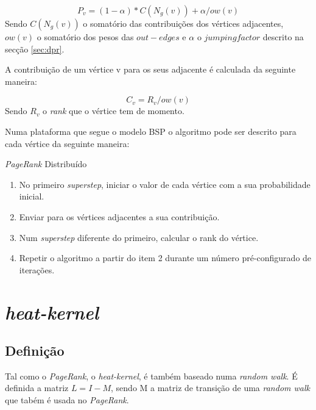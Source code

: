 \documentclass[a4paper,10pt]{report}
\begin{document}
  \begin{center}
    \begin{equation}
      \label{eq:prrankdistributed}
       P_v = (1-\alpha) * C(N_g(v)) + \alpha/ow(v)
    \end{equation}
    Sendo $C(N_g(v))$ o somatório das contribuições dos vértices adjacentes, $ow(v)$ o somatório dos pesos das $out-edges$ e $\alpha$ o $jumping factor$ descrito na secção \ref{sec:dpr}.
  \end{center}    
  
  A contribuição de um vértice v para os seus adjacente é calculada da seguinte maneira:
 
  \begin{center}
    \begin{equation}
      \label{eq:prcontributiondistributed}
       C_v=R_v/ow(v)
    \end{equation}
    Sendo $R_v$ o \textit{rank} que o vértice tem de momento.
  \end{center}    
  
  Numa plataforma que segue o modelo BSP o algoritmo pode ser descrito para cada vértice da seguinte maneira:
  \begin{algorithm}
    \caption{\textit{PageRank} Distribuído}\label{alg:prdistributed}
    \begin{enumerate}
      \item No primeiro \textit{superstep}, iniciar o valor de cada vértice com a sua probabilidade inicial.
      \item Enviar para os vértices adjacentes a sua contribuição.
      \item Num \textit{superstep} diferente do primeiro, calcular o rank do vértice.
      \item Repetir o algoritmo a partir do item 2 durante um número pré-configurado de iterações.
    \end{enumerate}
  \end{algorithm}
  
\section{\textit{heat-kernel}}

  \subsection{Definição}
  \label{sec:heatkerneldefinition}
  
    Tal como o \textit{PageRank}, o \textit{heat-kernel}, é também baseado numa \textit{random walk}. 
    É  definida a matriz $L=I-M$, sendo M a matriz de transição de uma \textit{random walk} que tabém é usada no \textit{PageRank}.
    
\end{document}
